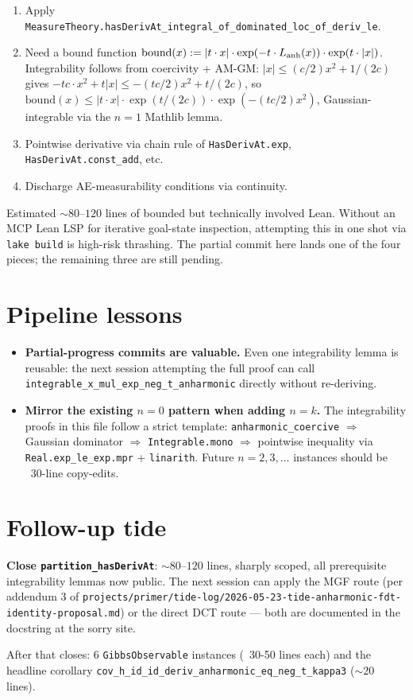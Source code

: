 \documentclass[11pt]{article}
\begin{document}
\begin{enumerate}[noitemsep,leftmargin=*]
\item Apply \texttt{MeasureTheory.hasDerivAt\_integral\_of\_dominated\_loc\_of\_deriv\_le}.
\item Need a bound function $\mathrm{bound}(x) := |t \cdot x| \cdot \exp(-t \cdot L_{\rm anh}(x)) \cdot \exp(t \cdot |x|)$.
  Integrability follows from coercivity + AM-GM:
  $|x| \leq (c/2) x^2 + 1/(2c)$ gives
  $-tc \cdot x^2 + t |x| \leq -(tc/2) x^2 + t/(2c)$, so
  $\mathrm{bound}(x) \leq |t \cdot x| \cdot \exp(t/(2c)) \cdot \exp(-(tc/2) x^2)$,
  Gaussian-integrable via the $n=1$ Mathlib lemma.
\item Pointwise derivative via chain rule of \texttt{HasDerivAt.exp},
  \texttt{HasDerivAt.const\_add}, etc.
\item Discharge AE-measurability conditions via continuity.
\end{enumerate}

Estimated $\sim 80$--$120$ lines of bounded but technically involved
Lean. Without an MCP Lean LSP for iterative goal-state inspection,
attempting this in one shot via \texttt{lake build} is high-risk
thrashing. The partial commit here lands one of the four pieces;
the remaining three are still pending.

\section{Pipeline lessons}

\begin{itemize}[noitemsep,leftmargin=*]
\item \textbf{Partial-progress commits are valuable.} Even one
  integrability lemma is reusable: the next session attempting the
  full proof can call \texttt{integrable\_x\_mul\_exp\_neg\_t\_anharmonic}
  directly without re-deriving.
\item \textbf{Mirror the existing $n=0$ pattern when adding $n=k$.}
  The integrability proofs in this file follow a strict template:
  \texttt{anharmonic\_coercive} $\Rightarrow$ Gaussian dominator
  $\Rightarrow$ \texttt{Integrable.mono} $\Rightarrow$ pointwise
  inequality via \texttt{Real.exp\_le\_exp.mpr} + \texttt{linarith}.
  Future $n=2, 3, \ldots$ instances should be ~30-line copy-edits.
\end{itemize}

\section{Follow-up tide}

\textbf{Close \texttt{partition\_hasDerivAt}}: $\sim 80$--$120$ lines,
sharply scoped, all prerequisite integrability lemmas now public.
The next session can apply the MGF route (per addendum 3 of
\texttt{projects/primer/tide-log/2026-05-23-tide-anharmonic-fdt-identity-proposal.md})
or the direct DCT route — both are documented in the docstring at the
sorry site.

After that closes: 6 \texttt{GibbsObservable} instances (~30-50 lines
each) and the headline corollary \texttt{cov\_h\_id\_id\_deriv\_anharmonic\_eq\_neg\_t\_kappa3}
($\sim 20$ lines).
\end{document}
